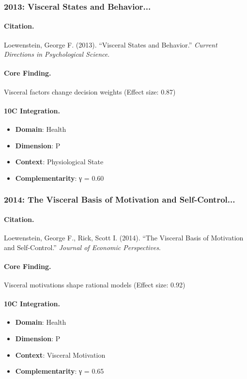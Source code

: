 \subsubsection{2013: Visceral States and Behavior...}

\paragraph{Citation.}
Loewenstein, George F. (2013). ``Visceral States and Behavior.''
\textit{Current Directions in Psychological Science}.

\paragraph{Core Finding.}
Visceral factors change decision weights (Effect size: 0.87)

\paragraph{10C Integration.}
\begin{itemize}[nosep]
  \item \textbf{Domain}: Health
  \item \textbf{Dimension}: P
  \item \textbf{Context}: Physiological State
  \item \textbf{Complementarity}: γ = 0.60
\end{itemize}

\subsubsection{2014: The Visceral Basis of Motivation and Self-Control...}

\paragraph{Citation.}
Loewenstein, George F., Rick, Scott I. (2014). ``The Visceral Basis of Motivation and Self-Control.''
\textit{Journal of Economic Perspectives}.

\paragraph{Core Finding.}
Visceral motivations shape rational models (Effect size: 0.92)

\paragraph{10C Integration.}
\begin{itemize}[nosep]
  \item \textbf{Domain}: Health
  \item \textbf{Dimension}: P
  \item \textbf{Context}: Visceral Motivation
  \item \textbf{Complementarity}: γ = 0.65
\end{itemize}

